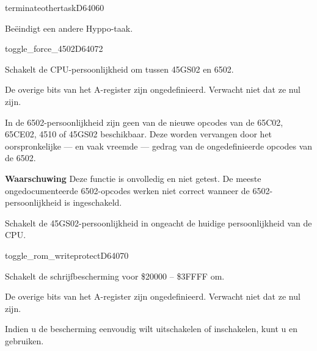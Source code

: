 \begin{hyppotrap}{terminateothertask}{D640}{60}
\item [Dienst:]  Beëindigt een andere Hyppo-taak.
\notimplemented
\end{hyppotrap}


\newpage
\begin{hyppotrap}{toggle\_force\_4502}{D640}{72}

\item [Dienst:]  Schakelt de CPU-persoonlijkheid om tussen 45GS02 en 6502.
\item [Uitvoer:]  
\item [Geschiedenis:]
\item [Opmerkingen:]  De overige bits van het A-register zijn ongedefinieerd. Verwacht niet dat ze nul zijn.

  In de 6502-persoonlijkheid zijn geen van de nieuwe opcodes van de 65C02, 65CE02, 4510 of 45GS02 beschikbaar. Deze worden vervangen door het oorspronkelijke --- en vaak vreemde --- gedrag van de ongedefinieerde opcodes van de 6502.

  \textbf{Waarschuwing} Deze functie is onvolledig en niet getest. De meeste ongedocumenteerde 6502-opcodes werken niet correct wanneer de 6502-persoonlijkheid is ingeschakeld.\item [Voorbeeld:]  Schakelt de 45GS02-persoonlijkheid in ongeacht de huidige persoonlijkheid van de CPU.
\end{hyppotrap}


\newpage
\begin{hyppotrap}{toggle\_rom\_writeprotect}{D640}{70}

\item [Dienst:]  Schakelt de schrijfbescherming voor \$20000 -- \$3FFFF om.
\item [Uitvoer:]  
\item [Geschiedenis:]
\item [Opmerkingen:]  De overige bits van het A-register zijn ongedefinieerd. Verwacht niet dat ze nul zijn.

  Indien u de bescherming eenvoudig wilt uitschakelen of inschakelen, kunt u  en  gebruiken.
\end{hyppotrap}



